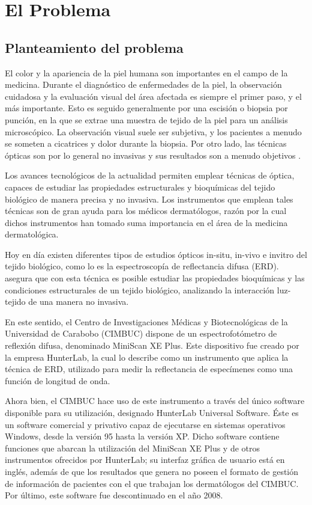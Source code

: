 \chapter{El Problema}

	\section{Planteamiento del problema}	
El color y la apariencia de la piel humana son importantes en el campo de la medicina. Durante el diagn\'{o}stico de enfermedades de la piel, la observaci\'{o}n cuidadosa y la evaluaci\'{o}n visual del \'{a}rea afectada es siempre el primer paso, y el m\'{a}s importante. Esto es seguido generalmente por una escisi\'{o}n o biopsia por punci\'{o}n, en la que se extrae una muestra de tejido de la piel para un an\'{a}lisis microsc\'{o}pico. La observaci\'{o}n visual suele ser subjetiva, y los pacientes a menudo se someten a cicatrices y dolor durante la biopsia. Por otro lado, las t\'{e}cnicas \'{o}pticas son por lo general no invasivas y sus resultados son a menudo objetivos \cite{Bersha}.

Los avances tecnol\'{o}gicos de la actualidad permiten emplear t\'{e}cnicas de \'{o}ptica, capaces de estudiar  las propiedades estructurales y bioqu\'{i}micas del tejido biol\'{o}gico de manera precisa y no invasiva. Los instrumentos que emplean tales t\'{e}cnicas son de gran ayuda para los m\'{e}dicos dermat\'{o}logos, raz\'{o}n por la cual dichos instrumentos han tomado suma importancia en el \'{a}rea de la medicina dermatol\'{o}gica.

Hoy en d\'{i}a existen diferentes tipos de estudios \'{o}pticos in-situ, in-vivo e invitro del tejido biol\'{o}gico, como lo es la espectroscop\'{i}a de reflectancia difusa (ERD).  asegura que con esta t\'{e}cnica es  posible estudiar las propiedades bioqu\'{i}micas y las condiciones estructurales de un tejido biol\'{o}gico, analizando la interacci\'{o}n luz-tejido de una manera no invasiva.

En este sentido, el Centro de Investigaciones M\'{e}dicas y Biotecnol\'{o}gicas de la Universidad de Carabobo (CIMBUC) dispone de un espectrofot\'{o}metro de reflexi\'{o}n difusa, denominado MiniScan XE Plus. Este dispositivo fue creado por la empresa HunterLab, la cual lo describe como un instrumento que aplica la t\'{e}cnica de ERD, utilizado para medir la reflectancia de espec\'{i}menes como una funci\'{o}n de longitud de onda.

Ahora bien, el CIMBUC hace uso de este instrumento a trav\'{e}s del \'{u}nico software disponible para su utilizaci\'{o}n, designado HunterLab Universal Software. \'{E}ste es un software comercial y privativo capaz de ejecutarse en sistemas operativos Windows, desde la versi\'{o}n 95 hasta la versi\'{o}n XP. Dicho software contiene funciones que abarcan la utilizaci\'{o}n del MiniScan XE Plus y de otros instrumentos ofrecidos por HunterLab; su interfaz gr\'{a}fica de usuario est\'{a} en ingl\'{e}s, adem\'{a}s de que los resultados que genera no poseen el formato de gesti\'{o}n de informaci\'{o}n de pacientes con el que trabajan los dermat\'{o}logos del CIMBUC. Por \'{u}ltimo, este software fue descontinuado en el a\~{n}o 2008.

